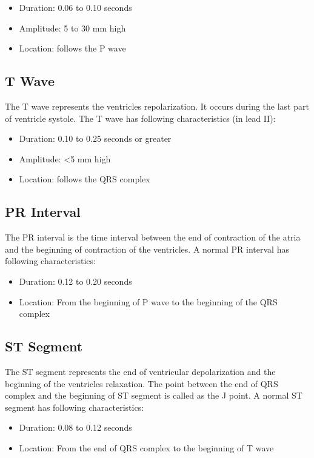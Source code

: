 \begin{itemize}
	\item Duration: 0.06 to 0.10 seconds
	\item Amplitude: 5 to 30 mm high
	\item Location: follows the P wave
\end{itemize}

\subsection{T Wave}
The T wave represents the ventricles repolarization. It occurs during the last part of ventricle systole. The T wave has following characteristics (in lead II):

\begin{itemize}
	\item Duration: 0.10 to 0.25 seconds or greater
	\item Amplitude: <5 mm high
	\item Location: follows the QRS complex
\end{itemize}

\subsection{PR Interval}
The PR interval is the time interval between the end of contraction of the atria and the beginning of contraction of the ventricles. A normal PR interval has following characteristics:

\begin{itemize}
	\item Duration: 0.12 to 0.20 seconds
	\item Location: From the beginning of P wave to the beginning of the QRS complex
\end{itemize}

\subsection{ST Segment}
The ST segment represents the end of ventricular depolarization and the beginning of the ventricles relaxation. The point between the end of QRS complex and the beginning of ST segment is called as the J point. A normal ST segment has following characteristics:

\begin{itemize}
	\item Duration: 0.08 to 0.12 seconds
	\item Location: From the end of QRS complex to the beginning of T wave
\end{itemize}

